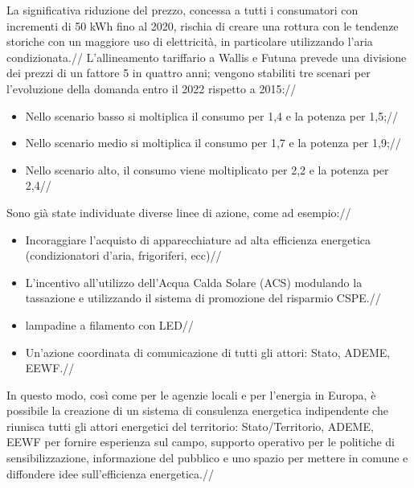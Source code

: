 \documentclass[fleqn,10pt]{SelfArx} %
\begin{document}
La significativa riduzione del prezzo, concessa a tutti i consumatori con incrementi di 50 kWh fino al 2020,  rischia di creare una rottura con le tendenze storiche con un maggiore uso di elettricità, in particolare utilizzando l'aria condizionata.//
L'allineamento tariffario a Wallis e Futuna prevede una divisione dei prezzi di un fattore 5 in quattro anni; vengono stabiliti tre scenari per l'evoluzione della domanda entro il 2022 rispetto a 2015://
\begin{itemize}
	\item Nello scenario basso si moltiplica il consumo per 1,4 e la potenza per 1,5;//
	\item Nello scenario medio si moltiplica il consumo per 1,7 e la potenza per 1,9;//
	\item Nello scenario alto, il consumo viene moltiplicato per 2,2 e la potenza per 2,4//
\end{itemize}
Sono già state individuate diverse linee di azione, come ad esempio://
\begin{itemize}
	\item Incoraggiare l'acquisto di apparecchiature ad alta efficienza energetica (condizionatori d'aria, frigoriferi, ecc)//
	\item L'incentivo all'utilizzo dell'Acqua Calda Solare (ACS) modulando la tassazione e utilizzando il sistema di promozione del risparmio CSPE.//
	\item lampadine a filamento con LED//
	\item Un'azione coordinata di comunicazione di tutti gli attori: Stato, ADEME, EEWF.//
\end{itemize}
In questo modo, così come per le agenzie locali e per l'energia in Europa, è possibile la creazione di un sistema di consulenza energetica indipendente che riunisca tutti gli attori energetici del territorio: Stato/Territorio, ADEME, EEWF per fornire esperienza sul campo, supporto operativo per le politiche di sensibilizzazione, informazione del pubblico e uno spazio per mettere in comune e diffondere idee sull'efficienza energetica.//	
\end{document}
